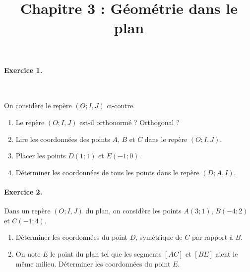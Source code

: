 \documentclass[11pt]{article}
\title{Chapitre 3 : Géométrie dans le plan}
\date{}
\author{}
\begin{document}

\paragraph{Exercice 1.}~\\
  \begin{minipage}{.5\textwidth}
   On considère le repère $(O; I, J)$ ci-contre.
   \begin{enumerate}
     \item Le repère $(O; I, J)$ est-il orthonormé ? Orthogonal ?
     \item Lire les coordonnées des points $A$, $B$ et $C$ dans le repère
       $(O; I, J)$.
     \item Placer les points $D(1; 1)$ et $E(-1;0)$.
     \item Déterminer les coordonnées de tous les points dans le repère
       $(D; A, I)$.
   \end{enumerate}
  \end{minipage}
  \begin{minipage}{.5\textwidth}
  \begin{center}
\end{center}
\end{minipage}
\paragraph{Exercice 2.} Dans un repère $(O; I, J)$ du plan, on considère les
points $A(3;1)$, $B(-4; 2)$ et $C(-1; 4)$.
\begin{enumerate}
  \item Déterminer les coordonnées du point $D$, symétrique de $C$ par rapport à
    $B$.
  \item On note $E$ le point du plan tel que les segments $\left[ AC
    \right]$ et $\left[ BE \right]$ aient le même milieu. Déterminer les
    coordonnées du point $E$.
\end{enumerate}
\end{document}
